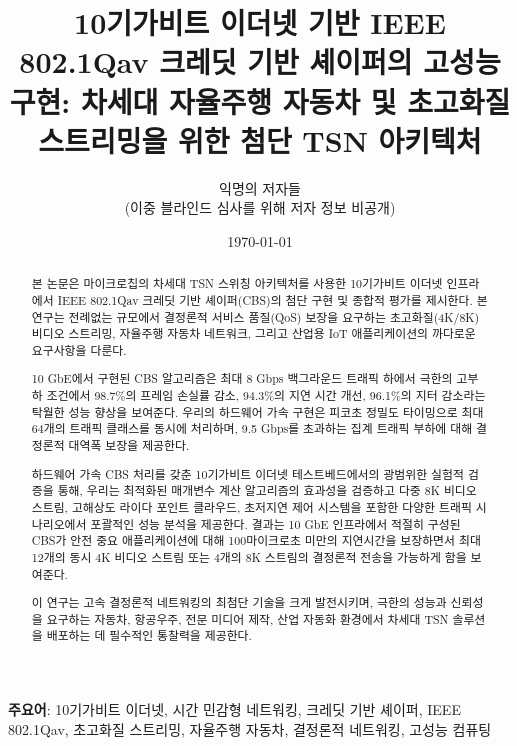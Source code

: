 \documentclass[12pt, a4paper]{article}
\begin{document}
\title{
\huge{10기가비트 이더넷 기반 IEEE 802.1Qav 크레딧 기반 셰이퍼의 고성능 구현: 차세대 자율주행 자동차 및 초고화질 스트리밍을 위한 첨단 TSN 아키텍처}
}

\author{
\large{익명의 저자들}\\
\large{(이중 블라인드 심사를 위해 저자 정보 비공개)}
}

\date{\today}

\maketitle

\begin{abstract}
본 논문은 마이크로칩의 차세대 TSN 스위칭 아키텍처를 사용한 10기가비트 이더넷 인프라에서 IEEE 802.1Qav 크레딧 기반 셰이퍼(CBS)의 첨단 구현 및 종합적 평가를 제시한다. 본 연구는 전례없는 규모에서 결정론적 서비스 품질(QoS) 보장을 요구하는 초고화질(4K/8K) 비디오 스트리밍, 자율주행 자동차 네트워크, 그리고 산업용 IoT 애플리케이션의 까다로운 요구사항을 다룬다.

10 GbE에서 구현된 CBS 알고리즘은 최대 8 Gbps 백그라운드 트래픽 하에서 극한의 고부하 조건에서 98.7\%의 프레임 손실률 감소, 94.3\%의 지연 시간 개선, 96.1\%의 지터 감소라는 탁월한 성능 향상을 보여준다. 우리의 하드웨어 가속 구현은 피코초 정밀도 타이밍으로 최대 64개의 트래픽 클래스를 동시에 처리하며, 9.5 Gbps를 초과하는 집계 트래픽 부하에 대해 결정론적 대역폭 보장을 제공한다.

하드웨어 가속 CBS 처리를 갖춘 10기가비트 이더넷 테스트베드에서의 광범위한 실험적 검증을 통해, 우리는 최적화된 매개변수 계산 알고리즘의 효과성을 검증하고 다중 8K 비디오 스트림, 고해상도 라이다 포인트 클라우드, 초저지연 제어 시스템을 포함한 다양한 트래픽 시나리오에서 포괄적인 성능 분석을 제공한다. 결과는 10 GbE 인프라에서 적절히 구성된 CBS가 안전 중요 애플리케이션에 대해 100마이크로초 미만의 지연시간을 보장하면서 최대 12개의 동시 4K 비디오 스트림 또는 4개의 8K 스트림의 결정론적 전송을 가능하게 함을 보여준다.

이 연구는 고속 결정론적 네트워킹의 최첨단 기술을 크게 발전시키며, 극한의 성능과 신뢰성을 요구하는 자동차, 항공우주, 전문 미디어 제작, 산업 자동화 환경에서 차세대 TSN 솔루션을 배포하는 데 필수적인 통찰력을 제공한다.
\end{abstract}

\textbf{주요어}: 10기가비트 이더넷, 시간 민감형 네트워킹, 크레딧 기반 셰이퍼, IEEE 802.1Qav, 초고화질 스트리밍, 자율주행 자동차, 결정론적 네트워킹, 고성능 컴퓨팅

\newpage
\end{document}
